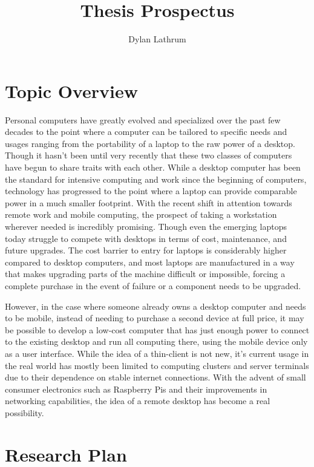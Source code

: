 \documentclass[11pt]{article}
\title{Thesis Prospectus}
\author{Dylan Lathrum}
\date{} %
\begin{document}
\maketitle

\section*{Topic Overview}

Personal computers have greatly evolved and specialized over the past few decades to the point where a computer can be tailored to specific needs and usages ranging from the portability of a laptop to the raw power of a desktop.
Though it hasn't been until very recently that these two classes of computers have begun to share traits with each other.
While a desktop computer has been the standard for intensive computing and work since the beginning of computers, technology has progressed to the point where a laptop can provide comparable power in a much smaller footprint.
With the recent shift in attention towards remote work and mobile computing, the prospect of taking a workstation wherever needed is incredibly promising.
Though even the emerging laptops today struggle to compete with desktops in terms of cost, maintenance, and future upgrades.
The cost barrier to entry for laptops is considerably higher compared to desktop computers, and most laptops are manufactured in a way that makes upgrading parts of the machine difficult or impossible, forcing a complete purchase in the event of failure or a component needs to be upgraded.

However, in the case where someone already owns a desktop computer and needs to be mobile, instead of needing to purchase a second device at full price, it may be possible to develop a low-cost computer that has just enough power to connect to the existing desktop and run all computing there, using the mobile device only as a user interface.
While the idea of a thin-client is not new, it's current usage in the real world has mostly been limited to computing clusters and server terminals due to their dependence on stable internet connections.
With the advent of small consumer electronics such as Raspberry Pis and their improvements in networking capabilities, the idea of a remote desktop has become a real possibility.

\section*{Research Plan}
\end{document}
